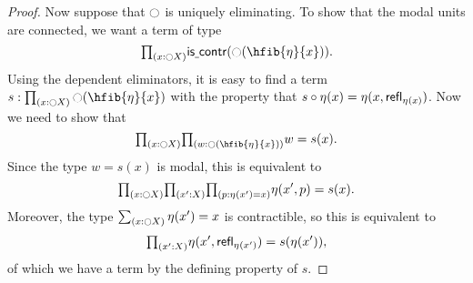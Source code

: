 \begin{proof}
Now suppose that ${\ocircle}$ is uniquely eliminating.
To show that the modal units are connected, we want a term of type
\begin{equation*}
\prd{x:\modal X}\iscontr(\modal(\hfib{\modalunit}{x})).
\end{equation*}
Using the dependent eliminators, it is easy to find a term
$s:\prd{x:\modal X}\modal(\hfib{\modalunit}{x})$ with the property that
$s\circ{\eta_{}}(x)={\eta_{}}(x,\mathsf{refl}_{{\eta_{}}(x)})$. Now we need to show
that
\begin{equation*}
\prd{x:\modal X}{w:\modal(\hfib{\modalunit}{x})}w=s(x).
\end{equation*}
Since the type $w=s(x)$ is modal, this is equivalent to
\begin{equation*}
\prd{x:\modal X}{x':X}{p:\modalunit(x')=x} \modalunit(x',p)=s(x).
\end{equation*}
Moreover, the type $\sm{x:\modal X}\modalunit(x')=x$ is contractible, so this
is equivalent to
\begin{equation*}
\prd{x':X} \modalunit(x',\refl{\modalunit(x')})=s(\modalunit(x')),
\end{equation*}
of which we have a term by the defining property of $s$.


\end{proof}
